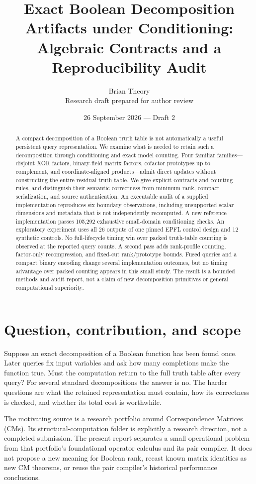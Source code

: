 \documentclass[11pt]{article}
\title{Exact Boolean Decomposition Artifacts under Conditioning:\\Algebraic Contracts and a Reproducibility Audit}
\author{Brian Theory\\\small Research draft prepared for author review}
\date{26 September 2026 --- Draft 2}
\theoremstyle{definition}\newtheorem{definition}[theorem]{Definition}
\theoremstyle{remark}\newtheorem{remark}[theorem]{Remark}
\begin{document}
\maketitle
\begin{abstract}
A compact decomposition of a Boolean truth table is not automatically a useful persistent query representation. We examine what is needed to retain such a decomposition through conditioning and exact model counting. Four familiar families---disjoint XOR factors, binary-field matrix factors, cofactor prototypes up to complement, and coordinate-aligned products---admit direct updates without constructing the entire residual truth table. We give explicit contracts and counting rules, and distinguish their semantic correctness from minimum rank, compact serialization, and source authentication. An executable audit of a supplied implementation reproduces six boundary observations, including unsupported scalar dimensions and metadata that is not independently recomputed. A new reference implementation passes 105,292 exhaustive small-domain conditioning checks. An exploratory experiment uses all 26 outputs of one pinned EPFL control design and 12 synthetic controls. No full-lifecycle timing win over packed truth-table counting is observed at the reported query counts. A second pass adds rank-profile counting, factor-only recompression, and fixed-cut rank/prototype bounds. Fused queries and a compact binary encoding change several implementation outcomes, but no timing advantage over packed counting appears in this small study. The result is a bounded methods and audit report, not a claim of new decomposition primitives or general computational superiority.
\end{abstract}

\section{Question, contribution, and scope}
\label{sec:scope}
Suppose an exact decomposition of a Boolean function has been found once. Later queries fix input variables and ask how many completions make the function true. Must the computation return to the full truth table after every query? For several standard decompositions the answer is no. The harder questions are what the retained representation must contain, how its correctness is checked, and whether its total cost is worthwhile.

The motivating source is a research portfolio around Correspondence Matrices (CMs)\cite{archive}. Its structural-computation folder is explicitly a research direction, not a completed submission. The present report separates a small operational problem from that portfolio's foundational operator calculus and its pair compiler. It does not propose a new meaning for Boolean rank, recast known matrix identities as new CM theorems, or reuse the pair compiler's historical performance conclusions.
\end{document}
